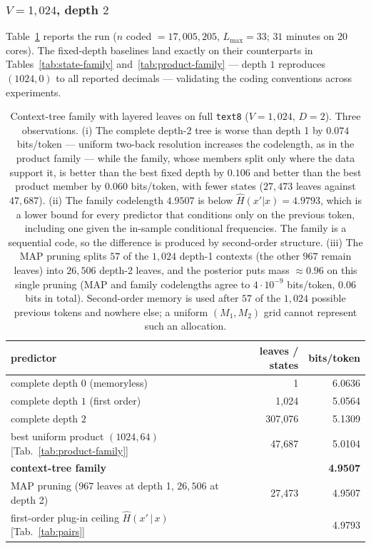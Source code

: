 \documentclass[11pt]{article}
\begin{document}
\subsubsection*{$V=1{,}024$, depth $2$}
Table~\ref{tab:context-tree} reports the run ($n$ coded
$= 17{,}005{,}205$, $L_{\max}=33$; $31$ minutes on 20 cores).  The
fixed-depth baselines land exactly on their counterparts in
Tables~\ref{tab:state-family} and~\ref{tab:product-family} --- depth $1$
reproduces $(1024,0)$ to all reported decimals --- validating the coding
conventions across experiments.

\begin{table}[ht]
\centering
\begin{tabular}{lrr}
\toprule
predictor & leaves / states & bits/token \\
\midrule
complete depth $0$ (memoryless)            & 1          & 6.0636 \\
complete depth $1$ (first order)           & 1{,}024    & 5.0564 \\
complete depth $2$                         & 307{,}076  & 5.1309 \\
best uniform product $(1024, 64)$
  [Tab.~\ref{tab:product-family}]          & 47{,}687   & 5.0104 \\
\textbf{context-tree family}               &            & \textbf{4.9507} \\
MAP pruning ($967$ leaves at depth 1,
  $26{,}506$ at depth 2)                   & 27{,}473   & 4.9507 \\
\midrule
first-order plug-in ceiling $\hat H(x'\,|\,x)$
  [Tab.~\ref{tab:pairs}]                   &            & 4.9793 \\
\bottomrule
\end{tabular}
\caption{Context-tree family with layered leaves on full \texttt{text8}
  ($V=1{,}024$, $D=2$).  Three observations.  (i) The complete depth-2
  tree is worse than depth 1 by $0.074$ bits/token --- uniform two-back
  resolution increases the codelength, as in the product family ---
  while the family, whose members split only where the data support it,
  is better than the best fixed depth by $0.106$ and better than the
  best product member by $0.060$ bits/token, with fewer states
  ($27{,}473$ leaves against $47{,}687$).  (ii) The family codelength
  $4.9507$ is below $\hat H(x'|x) = 4.9793$, which is a lower bound for
  every predictor that conditions only on the previous token, including
  one given the in-sample conditional frequencies.  The family is a
  sequential code, so the difference is produced by second-order
  structure.  (iii) The MAP pruning splits $57$ of the $1{,}024$
  depth-1 contexts (the other $967$ remain leaves) into $26{,}506$
  depth-2 leaves, and the posterior puts mass $\approx 0.96$ on this
  single pruning (MAP and family codelengths agree to
  $4\cdot 10^{-9}$ bits/token, $0.06$ bits in total).  Second-order
  memory is used after $57$ of the $1{,}024$ possible previous tokens
  and nowhere else; a uniform $(M_1,M_2)$ grid cannot represent such an
  allocation.}
\label{tab:context-tree}
\end{table}
\end{document}
